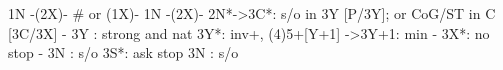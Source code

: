 1N -(2X)-  # or (1X)- 1N -(2X)-
2N*->3C*: s/o in 3Y [P/3Y]; or CoG/ST in C [3C/3X]
   - 3Y : strong and nat
3Y*: inv+, (4)5+[Y+1]
   ->3Y+1: min
   - 3X*: no stop
   - 3N : s/o
3S*: ask stop
3N : s/o